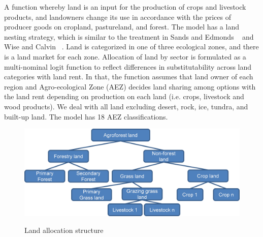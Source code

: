 \documentclass[10pt,a4paper,titlepage,dvipdfmx]{book}
\begin{document}
\begin{itemize}
A function whereby land is an input for the production of crops and livestock products, and landowners change its use in accordance with the prices of producer goods on cropland, pastureland, and forest. The model has a land nesting strategy, which is similar to the treatment in  Sands and Edmonds ~\cite{RN1860} and Wise and Calvin ~\cite{RN1597}. Land is categorized in one of three ecological zones, and there is a land market for each zone. Allocation of land by sector is formulated as a multi-nominal logit function to reflect differences in substitutability across land categories with land rent. In that, the function assumes that land owner of each region and Agro-ecological Zone (AEZ) decides land sharing among options with the land rent depending on production on each land (i.e. crops, livestock and wood products). We deal with all land excluding desert, rock, ice, tundra, and built-up land. The model has 18 AEZ classifications.

\begin{figure}
\includegraphics[width=1\textwidth]{fig/image22.png}
\label{fig:12}
\caption{\label{fig:LanAlloStr}Land allocation structure}
\end{figure}


\end{itemize}
\end{document}

